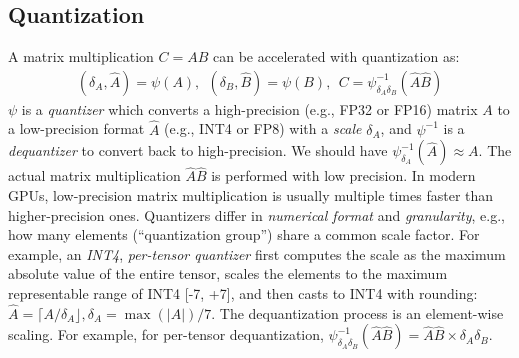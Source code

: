 \subsection{Quantization} \label{sec:quantization}
A matrix multiplication $C=AB$ can be accelerated with quantization as:
\begin{align*}
(\delta_A, \hat A) = \psi(A),~~(\delta_B, \hat B) = \psi(B), ~~C=\psi^{-1}_{\delta_A\delta_B}(\hat A\hat B)
\end{align*}
$\psi$ is a \textit{quantizer} which converts a high-precision (e.g., FP32 or FP16) matrix $A$ to a low-precision format $\hat A$ (e.g., INT4 or FP8) with a \textit{scale} $\delta_A$, and $\psi^{-1}$ is a \textit{dequantizer} to convert back to high-precision. We should have $\psi^{-1}_{\delta_A}(\hat A)\approx A$. The actual matrix multiplication $\hat A\hat B$ is performed with low precision. In modern GPUs, low-precision matrix multiplication is usually multiple times faster than higher-precision ones. 
Quantizers differ in \emph{numerical format} and \emph{granularity}, e.g., how many elements (``quantization group'') share a common scale factor. 
For example, an \emph{INT4}, \textit{per-tensor quantizer} first computes the scale as the maximum absolute value of the entire tensor, scales the elements to the maximum representable range of INT4 [-7, +7], and then casts to INT4 with rounding: $\hat A = \lceil A/\delta_A \rfloor, \delta_A=\max(|{A}|)/7$. 
The dequantization process is an element-wise scaling. For example, for per-tensor dequantization, $\psi_{\delta_A\delta_B}^{-1}(\hat A\hat B)=\hat A \hat B \times \delta_A \delta_B$.

\begin{table}[htb!]
    \centering
    \caption{Speedup compared to matrix multiplication in FP16 with an FP32 accumulator.}
    \label{tab:speedup_of_tensor_core}
    \setlength\tabcolsep{8.1pt}
\vspace{-.5em}
\end{table}

